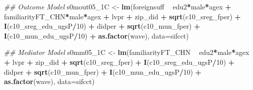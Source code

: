 \documentclass[
]{article}
\newenvironment{Shaded}{\begin{snugshade}}{\end{snugshade}}
\newcommand{\CommentTok}[1]{\textcolor[rgb]{0.56,0.35,0.01}{\textit{#1}}}
\newcommand{\DataTypeTok}[1]{\textcolor[rgb]{0.13,0.29,0.53}{#1}}
\newcommand{\DecValTok}[1]{\textcolor[rgb]{0.00,0.00,0.81}{#1}}
\newcommand{\KeywordTok}[1]{\textcolor[rgb]{0.13,0.29,0.53}{\textbf{#1}}}
\newcommand{\NormalTok}[1]{#1}
\newcommand{\OperatorTok}[1]{\textcolor[rgb]{0.81,0.36,0.00}{\textbf{#1}}}
\newcommand{\StringTok}[1]{\textcolor[rgb]{0.31,0.60,0.02}{#1}}
\begin{document}
\begin{Shaded}
\begin{Highlighting}[]
\CommentTok{## Outcome Model }
\NormalTok{s0mout05_1C <-}\StringTok{ }\KeywordTok{lm}\NormalTok{(foreignsuff  }\OperatorTok{~}\StringTok{ }\NormalTok{edu2}\OperatorTok{*}\NormalTok{male}\OperatorTok{*}\NormalTok{agex }\OperatorTok{+}\StringTok{ }\NormalTok{familiarityFT_CHN}\OperatorTok{*}\NormalTok{male}\OperatorTok{*}\NormalTok{agex }\OperatorTok{+}\StringTok{ }\NormalTok{lvpr }\OperatorTok{+}\StringTok{  }
\StringTok{                    }\NormalTok{zip_did }\OperatorTok{+}\StringTok{ }\KeywordTok{sqrt}\NormalTok{(c10_sreg_fper) }\OperatorTok{+}\StringTok{ }\KeywordTok{I}\NormalTok{(c10_sreg_edu_ugsP}\OperatorTok{/}\DecValTok{10}\NormalTok{) }\OperatorTok{+}\StringTok{ }
\StringTok{                    }\NormalTok{didper }\OperatorTok{+}\StringTok{ }\KeywordTok{sqrt}\NormalTok{(c10_mun_fper) }\OperatorTok{+}\StringTok{ }\KeywordTok{I}\NormalTok{(c10_mun_edu_ugsP}\OperatorTok{/}\DecValTok{10}\NormalTok{) }\OperatorTok{+}\StringTok{ }
\StringTok{                    }\KeywordTok{as.factor}\NormalTok{(wave), }\DataTypeTok{data=}\NormalTok{sifcct)}

\CommentTok{## Mediator Model}
\NormalTok{s0mm05_1C <-}\StringTok{ }\KeywordTok{lm}\NormalTok{(familiarityFT_CHN  }\OperatorTok{~}\StringTok{ }\NormalTok{edu2}\OperatorTok{*}\NormalTok{male}\OperatorTok{*}\NormalTok{agex }\OperatorTok{+}\StringTok{ }\NormalTok{lvpr }\OperatorTok{+}\StringTok{  }
\StringTok{                  }\NormalTok{zip_did }\OperatorTok{+}\StringTok{ }\KeywordTok{sqrt}\NormalTok{(c10_sreg_fper) }\OperatorTok{+}\StringTok{ }\KeywordTok{I}\NormalTok{(c10_sreg_edu_ugsP}\OperatorTok{/}\DecValTok{10}\NormalTok{) }\OperatorTok{+}\StringTok{ }
\StringTok{                  }\NormalTok{didper }\OperatorTok{+}\StringTok{ }\KeywordTok{sqrt}\NormalTok{(c10_mun_fper) }\OperatorTok{+}\StringTok{ }\KeywordTok{I}\NormalTok{(c10_mun_edu_ugsP}\OperatorTok{/}\DecValTok{10}\NormalTok{) }\OperatorTok{+}\StringTok{ }
\StringTok{                  }\KeywordTok{as.factor}\NormalTok{(wave), }\DataTypeTok{data=}\NormalTok{sifcct)}


\end{Highlighting}
\end{Shaded}
\end{document}
